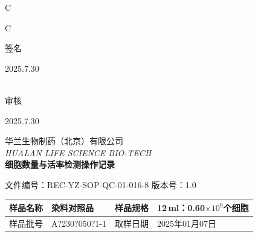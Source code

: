 \documentclass[UTF8,10pt,a4paper,fontset=fandol]{ctexart}
\newcommand{\fieldvalue}[1]{#1}
\newcommand{\handwritten}[1]{#1}
\begin{document}
\begin{center}
\begin{center}
\vspace{1em}


\vspace{8em}

\handwritten{C}

\vfill

\handwritten{C}

\vfill

\begin{flushright}
\handwritten{签名}

\quad
\handwritten{2025.7.30}

\\[1em]

\handwritten{审核}

\quad
\handwritten{2025.7.30}
\end{flushright}

\newpage

\begin{center}
华兰生物制药（北京）有限公司\\
\textit{HUALAN LIFE SCIENCE BIO-TECH}\\[2pt]
\textbf{细胞数量与活率检测操作记录}
\end{center}

\noindent
文件编号：REC-YZ-SOP-QC-01-016-8 \hfill 版本号：1.0

\begin{tabularx}{\textwidth}{|l|X|l|X|}
\hline
样品名称 &
\fieldvalue{\handwritten{染料对照品}} &
样品规格 &
\fieldvalue{\handwritten{12\,ml：0.60$\times 10^{9}$个细胞}}\\
\hline
样品批号 &
\fieldvalue{\handwritten{A?230?050?1-1}} &
取样日期 &
\fieldvalue{\handwritten{2025年01月07日}}\\
\hline
\end{tabularx}


\end{center}
\end{center}
\end{document}
